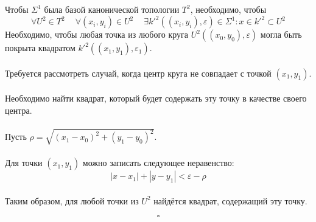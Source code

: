 \documentclass{article}
\begin{document}
        Чтобы $\Sigma^1$ была базой канонической топологии $T^2$, необходимо, чтобы
        \[\forall U^2 \in T^2 \ \quad \forall (x_i, y_i) \in U^2 \ \quad \exists k'^2((x_i, y_i), \varepsilon) \in \Sigma^1 : x \in k'^2 \subset U^2 \]
        Необходимо, чтобы любая точка из любого круга $U^2((x_0, y_0), \varepsilon)$ могла быть покрыта квадратом $k'^2((x_1, y_1), \varepsilon_1)$.\\ \\Требуется рассмотреть случай, когда центр круга не совпадает с точкой $(x_1, y_1)$.\\ \\Необходимо найти квадрат, который будет содержать эту точку в качестве своего центра.\\ \\Пусть $\rho = \sqrt{(x_1 - x_0)^2 + (y_1 - y_0)^2}$.\\ \\Для точки $(x_1, y_1)$ можно записать следующее неравенство:
        \[
        |x - x_1| + |y - y_1| < \varepsilon - \rho
        \]\\Таким образом, для любой точки из $U^2$ найдётся квадрат, содержащий эту точку.
        
        \[
        \square
        \]
        

        
               
        
\end{document}
